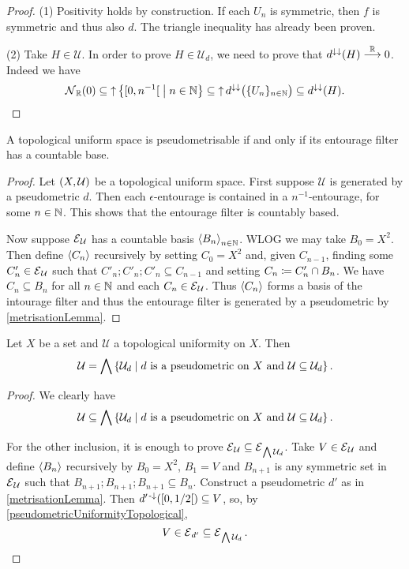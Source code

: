 \begin{proof}
(1) Positivity holds by construction. If each $U_n$ is symmetric, then $f$ is symmetric and thus also $d$. The triangle inequality has already been proven.

(2) Take $H\in \mathcal{U}$. In order to prove $H\in \mathcal{U}_d$, we need to prove that $d^{\downarrow\downarrow}(H)\overset{\mathbb{R}}{\longrightarrow} 0$. Indeed we have
\[ \neighbourhood_\R(0) \subseteq \upset \setbuilder{\interval[co]{0, n^{-1}}}{n\in \N} \subseteq \upset d^{\imf\imf}\big(\{U_n\}_{n\in\N}\big) \subseteq d^{\imf\imf}(H). \]
\end{proof}

\begin{theorem}
A topological uniform space is pseudometrisable \textup{if and only if} its entourage filter has a countable base.
\end{theorem}
\begin{proof}
Let $\left( X,\mathcal{U} \right)$ be a topological uniform space. First suppose $\mathcal{U}$ is generated by a pseudometric $d$. Then each $\epsilon$-entourage is contained in a $n^{-1}$-entourage, for some $n\in \mathbb{N}$. This shows that the entourage filter is countably based.

Now suppose $\operatorname{\mathcal{E}}_\mathcal{U}$ has a countable basis $\left\langle B_n \right\rangle_{n\in \mathbb{N}}$. WLOG we may take $B_0 = X^2$. Then define $\left\langle C_n \right\rangle$ recursively by setting $C_0 = X^2$ and, given $C_{n-1}$, finding some $C'_{n}\in \operatorname{\mathcal{E}}_\mathcal{U}$ such that $C'_{n};C'_{n};C'_{n} \subseteq C_{n-1}$ and setting $C_n \coloneqq C'_n \cap B_n$. We have $C_n\subseteq B_n$ for all $n\in \mathbb{N}$ and each $C_n\in \operatorname{\mathcal{E}}_\mathcal{U}$. Thus $\left\langle C_n \right\rangle$ forms a basis of the intourage filter and thus the entourage filter is generated by a pseudometric by \ref{metrisationLemma}. 
\end{proof}

\begin{proposition} \label{topologicalUniformityGeneratedByPseudometrics}
Let $X$ be a set and $\mathcal{U}$ a topological uniformity on $X$. Then 
\[ \mathcal{U} =  \bigwedge \left\{ \mathcal{U}_d \;\middle|\; \text{$d$ is a pseudometric on $X$ and $\mathcal{U}\subseteq \mathcal{U}_d$} \right\}. \]
\end{proposition}
\begin{proof}
We clearly have
\[ \mathcal{U} \subseteq \bigwedge \left\{ \mathcal{U}_d \;\middle|\; \text{$d$ is a pseudometric on $X$ and $\mathcal{U}\subseteq \mathcal{U}_d$} \right\}. \]

For the other inclusion, it is enough to prove $\operatorname{\mathcal{E}}_\mathcal{U} \subseteq \operatorname{\mathcal{E}}_{\bigwedge \mathcal{U}_d}$. Take $V\in \operatorname{\mathcal{E}}_\mathcal{U}$ and define $\left\langle B_n \right\rangle$ recursively by $B_0 = X^2$, $B_1 = V$ and $B_{n+1}$ is any symmetric set in $\operatorname{\mathcal{E}}_\mathcal{U}$ such that $B_{n+1};B_{n+1};B_{n+1} \subseteq B_n$. Construct a pseudometric $d'$ as in \ref{metrisationLemma}. Then $d^{\prime\preimf}(\interval[co]{0,1/2})\subseteq V$, so, by \ref{pseudometricUniformityTopological},
\[ V \in \operatorname{\mathcal{E}}_{d'} \subseteq \operatorname{\mathcal{E}}_{\bigwedge \mathcal{U}_d}. \]
\end{proof}

